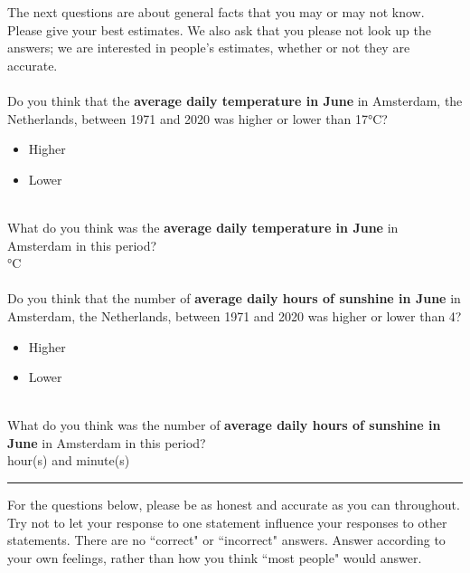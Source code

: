 \noindent The next questions are about general facts that you may or may not know.
Please give your best estimates.
We also ask that you please not look up the answers; we are interested in people's estimates, whether or not they are accurate.\\
\\
Do you think that the \textbf{average daily temperature in June} in Amsterdam, the Netherlands, between 1971 and 2020 was higher or lower than 17°C?
\begin{itemize}
\item Higher
\item Lower
\end{itemize}
\leavevmode \\
\noindent What do you think was the \textbf{average daily temperature in June} in Amsterdam in this period?\\
\framebox[0.1\textwidth]{\rule{0pt}{15pt}}°C\\
\\
\noindent Do you think that the number of \textbf{average daily hours of sunshine in June} in Amsterdam, the Netherlands, between 1971 and 2020 was higher or lower than 4?
\begin{itemize}
\item Higher
\item Lower
\end{itemize}
\leavevmode \\
\noindent What do you think was the number of \textbf{average daily hours of sunshine in June} in Amsterdam in this period?\\
\framebox[0.1\textwidth]{\rule{0pt}{15pt}} hour(s) and \framebox[0.1\textwidth]{\rule{0pt}{15pt}} minute(s)

\bigskip
\noindent \rule{\linewidth}{0.4pt}

\noindent For the questions below, please be as honest and accurate as you can throughout.
Try not to let your response to one statement influence your responses to other statements.
There are no ``correct" or ``incorrect" answers.
Answer according to your own feelings, rather than how you think ``most people" would answer.

